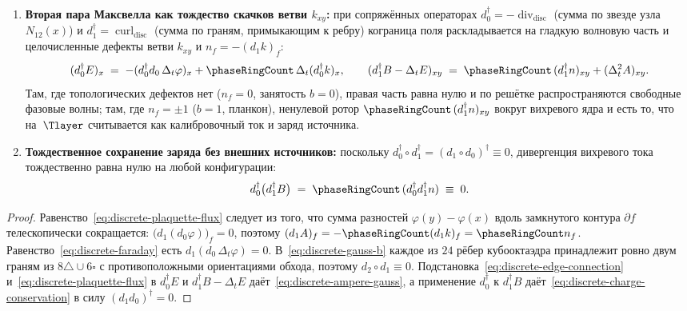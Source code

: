 \begin{theorem}
\begin{enumerate}[label=(\roman*)]
  квантов потока через $14$ граней кубооктаэдра совпадает тождественно.
\item \textbf{Вторая пара Максвелла как тождество скачков ветви $k_{xy}$:}
  при сопряжённых операторах $d_0^\dagger = -\operatorname{div}_{\mathrm{disc}}$ (сумма по звезде узла $N_{12}(x)$)
  и $d_1^\dagger = \operatorname{curl}_{\mathrm{disc}}$ (сумма по граням, примыкающим к ребру)
  кограница поля раскладывается на гладкую волновую часть и целочисленные дефекты ветви $k_{xy}$ и $n_f = -(d_1 k)_f$:
  \begin{equation}
  \label{eq:discrete-ampere-gauss}
    (d_0^\dagger E)_x \;=\; -(d_0^\dagger d_0\,\Delta_t\varphi)_x + \phaseRingCount\,\Delta_t(d_0^\dagger k)_x,
    \qquad
    (d_1^\dagger B - \Delta_t E)_{xy}
    \;=\;
    \phaseRingCount\,(d_1^\dagger n)_{xy} + (\Delta_t^2 A)_{xy}.
  \end{equation}
  Там, где топологических дефектов нет ($n_f=0$, занятость $b=0$), правая часть равна нулю и по решётке
  распространяются свободные фазовые волны; там, где $n_f=\pm 1$ ($b=1$, планкон), ненулевой ротор
  $\phaseRingCount\,(d_1^\dagger n)_{xy}$ вокруг вихревого ядра и есть то, что на~$\Tlayer$ считывается
  как калибровочный ток и заряд источника.
\item \textbf{Тождественное сохранение заряда без внешних источников:}
  поскольку $d_0^\dagger\circ d_1^\dagger = (d_1\circ d_0)^\dagger \equiv 0$, дивергенция вихревого тока
  тождественно равна нулю на любой конфигурации:
  \begin{equation}
  \label{eq:discrete-charge-conservation}
    d_0^\dagger\bigl(d_1^\dagger B\bigr) \;=\; \phaseRingCount\,(d_0^\dagger d_1^\dagger n) \;\equiv\; 0.
  \end{equation}
\end{enumerate}
\end{theorem}

\begin{proof}
Равенство~\eqref{eq:discrete-plaquette-flux} следует из того, что сумма разностей $\varphi(y)-\varphi(x)$
вдоль замкнутого контура $\partial f$ телескопически сокращается: $\bigl(d_1(d_0\varphi)\bigr)_f = 0$,
поэтому $(d_1 A)_f = -\phaseRingCount(d_1 k)_f = \phaseRingCount n_f$.
Равенство~\eqref{eq:discrete-faraday} есть $d_1(d_0\,\Delta_t\varphi)=0$.
В~\eqref{eq:discrete-gauss-b} каждое из $24$ рёбер кубооктаэдра принадлежит ровно двум граням из $8\triangle\cup 6\square$
с противоположными ориентациями обхода, поэтому $d_2\circ d_1\equiv 0$.
Подстановка~\eqref{eq:discrete-edge-connection} и~\eqref{eq:discrete-plaquette-flux} в $d_0^\dagger E$ и $d_1^\dagger B-\Delta_t E$
даёт~\eqref{eq:discrete-ampere-gauss}, а применение $d_0^\dagger$ к $d_1^\dagger B$ даёт~\eqref{eq:discrete-charge-conservation}
в силу $(d_1 d_0)^\dagger = 0$.
\end{proof}

